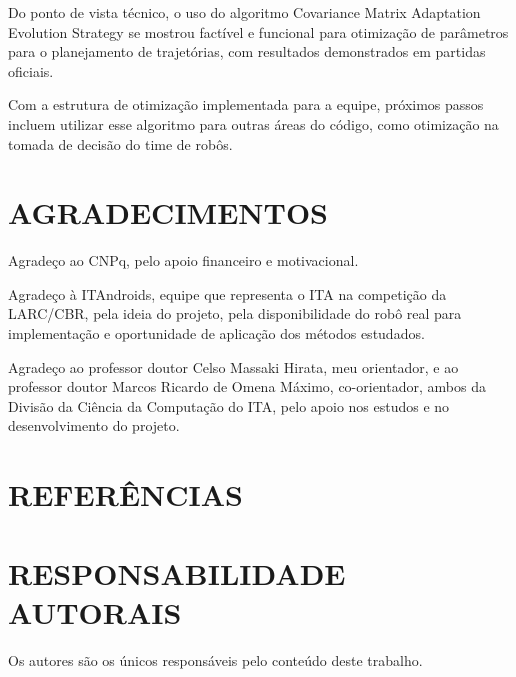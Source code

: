 \documentclass[10pt,fleqn,a4paper]{article}
\begin{document}
Do ponto de vista técnico, o uso do algoritmo Covariance Matrix Adaptation Evolution Strategy se mostrou factível e funcional para otimização de parâmetros para o planejamento de trajetórias, com resultados demonstrados em partidas oficiais.

Com a estrutura de otimização implementada para a equipe, próximos passos incluem utilizar esse algoritmo para outras áreas do código, como otimização na tomada de decisão do time de robôs.

    \section{AGRADECIMENTOS}
    
	Agradeço ao CNPq, pelo apoio financeiro e motivacional.
	
	Agradeço à ITAndroids, equipe que representa o ITA na competição da LARC/CBR, pela ideia do projeto, pela disponibilidade do robô real para implementação e oportunidade de aplicação dos métodos estudados.

	Agradeço ao professor doutor Celso Massaki Hirata, meu orientador, e ao professor doutor Marcos Ricardo de Omena Máximo, co-orientador, ambos da Divisão da Ciência da Computação do ITA, pelo apoio nos estudos e no desenvolvimento do projeto.

    \section{REFERÊNCIAS}
        
        

    \section{RESPONSABILIDADE AUTORAIS}
    
        Os autores são os únicos responsáveis pelo conteúdo deste trabalho.
\end{document}
